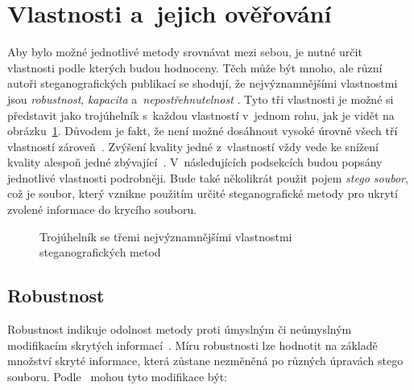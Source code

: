 \section{Vlastnosti a~jejich ověřování}
\label{sec:method-properties}

Aby bylo možné jednotlivé metody srovnávat mezi sebou, je nutné určit
vlastnosti podle kterých budou hodnoceny. Těch může být mnoho, ale různí autoři
steganografických publikací se shodují, že nejvýznamnějšími vlastnostmi jsou
\textit{robustnost}, \textit{kapacita} a~\textit{nepostřehnutelnost}
\cite{AlSabhany2020}\cite{Djebbar2012}\cite{Dutta2020}. Tyto tři vlastnosti je
možné si představit jako trojúhelník s~každou vlastností v~jednom rohu, jak je
vidět na obrázku~\ref{pic:method-property-triangle}. Důvodem je fakt, že není
možné dosáhnout vysoké úrovně všech tří vlastností zároveň~\cite{Dutta2020}.
Zvýšení kvality jedné z~vlastností vždy vede ke snížení kvality alespoň jedné
zbývající~\cite{AlSabhany2020}\cite{Djebbar2012}. V~následujících podsekcích
budou popsány jednotlivé vlastnosti podrobněji. Bude také několikrát použit
pojem \textit{stego soubor}, což je soubor, který vznikne použitím určité
steganografické metody pro ukrytí zvolené informace do krycího souboru.

\begin{figure}[hbt]
    \centering
    \caption{Trojúhelník se třemi nejvýznamnějšími vlastnostmi
    steganografických metod}
    \label{pic:method-property-triangle}
\end{figure}

\subsection*{Robustnost}
\label{sub:robustness}

Robustnost indikuje odolnost metody proti úmyslným či neúmyslným modifikacím
skrytých informací~\cite{AlSabhany2020}\cite{Dutta2020}. Míru robustnosti lze
hodnotit na základě množství skryté informace, která zůstane nezměněná po
různých úpravách stego souboru. Podle~\cite{Djebbar2012} mohou tyto modifikace
být:

